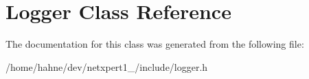 \hypertarget{classLogger}{}\section{Logger Class Reference}
\label{classLogger}


The documentation for this class was generated from the following file\+:\begin{DoxyCompactItemize}
\item 
/home/hahne/dev/netxpert1\+\_/include/logger.\+h\end{DoxyCompactItemize}
